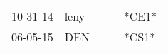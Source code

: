 \begin{supertabular}{p{0.07\textwidth}p{0.06\textwidth}p{0.02\textwidth}p{0.02\textwidth}p{0.06\textwidth}}
 10-31-14\textsuperscript{} &  leny\textsuperscript{} &   &   &  *CE1* \\
 06-05-15\textsuperscript{} &   DEN\textsuperscript{} &   &   &  *CS1* \\
\end{supertabular}
